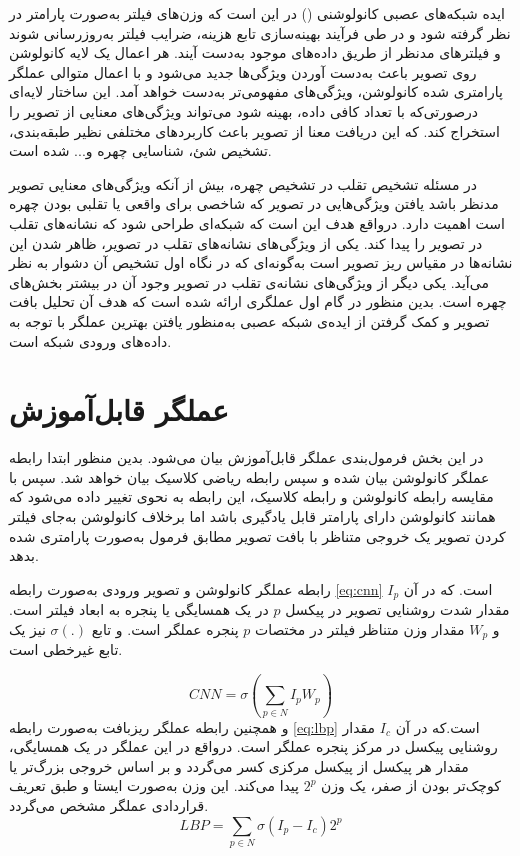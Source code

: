 ایده شبکه‌های عصبی کانولوشنی
 () 
در این است که وزن‌های فیلتر به‌صورت پارامتر در نظر گرفته شود و در طی فرآیند بهینه‌سازی تابع هزینه، ضرایب فیلتر به‌روزرسانی شوند و فیلترهای مد‌نظر از طریق داده‌های موجود به‌دست آیند. 
هر اعمال یک لایه کانولوشن روی تصویر باعث به‌دست آوردن ویژگی‌ها جدید می‌شود و با اعمال متوالی عملگر پارامتری شده کانولوشن، ویژگی‌های مفهومی‌تر به‌دست خواهد آمد. این ساختار لایه‌ای درصورتی‌که با تعداد کافی داده، بهینه شود می‌تواند ویژگی‌های معنایی از تصویر را استخراج کند. که این دریافت معنا از تصویر باعث کاربردهای مختلفی نظیر طبقه‌بندی، تشخیص شئ، شناسایی چهره و... شده است.

در مسئله تشخیص تقلب در تشخیص چهره، بیش از آنکه ویژگی‌های معنایی تصویر مد‌نظر باشد یافتن ویژگی‌هایی در تصویر که شاخصی برای واقعی یا تقلبی بودن چهره است اهمیت دارد. در‌واقع هدف این است که شبکه‌ای طراحی شود که نشانه‌های تقلب در تصویر را پیدا کند. یکی از ویژگی‌های نشانه‌های تقلب در تصویر، ظاهر شدن این نشانه‌ها در مقیاس ریز تصویر است به‌گونه‌ای که در نگاه اول تشخیص آن دشوار به نظر می‌آید. یکی دیگر از ویژگی‌های نشانه‌ی تقلب در تصویر وجود آن در بیشتر بخش‌های چهره است. بدین منظور در گام اول عملگری ارائه شده است که هدف آن تحلیل بافت تصویر و کمک گرفتن از ایده‌ی شبکه عصبی به‌منظور یافتن بهترین عملگر با توجه به داده‌های ورودی شبکه است.

\section{عملگر  قابل‌آموزش}
در این بخش فرمول‌بندی عملگر 
قابل‌آموزش بیان می‌شود. بدین منظور ابتدا رابطه عملگر کانولوشن بیان شده و سپس رابطه ریاضی 
کلاسیک بیان خواهد شد. سپس با مقایسه رابطه کانولوشن و رابطه 
کلاسیک، این رابطه به نحوی تغییر داده می‌شود که همانند کانولوشن دارای پارامتر  قابل یادگیری باشد اما بر‌خلاف کانولوشن به‌جای فیلتر کردن تصویر یک خروجی متناظر با بافت تصویر مطابق فرمول 
به‌صورت پارامتری شده بدهد.

رابطه عملگر کانولوشن و تصویر ورودی به‌صورت رابطه 
\ref{eq:cnn}
است. که در آن 
$I_p$
مقدار شدت روشنایی تصویر در پیکسل $p$ در یک همسایگی یا پنجره به ابعاد فیلتر است. و 
 $W_p$
مقدار وزن متناظر فیلتر در مختصات $p$ پنجره عملگر است. و تابع
$\sigma(.)$  
نیز یک تابع غیرخطی است.

\begin{equation}\label{eq:cnn}
	CNN=\sigma(\sum_{p\in N}I_pW_p)
\end{equation}
و همچنین رابطه عملگر ریزبافت
 به‌صورت رابطه
\ref{eq:lbp}
 است.که در آن
$I_c$
   مقدار روشنایی پیکسل در مرکز پنجره عملگر است. در‌واقع در این عملگر در یک همسایگی، مقدار هر پیکسل از پیکسل مرکزی کسر می‌گردد و بر اساس خروجی بزرگ‌تر یا کوچک‌تر بودن از صفر، یک وزن  
$2^p$   
   پیدا می‌کند. این وزن به‌صورت ایستا و طبق تعریف قراردادی عملگر مشخص می‌گردد.
\begin{equation}\label{eq:lbp}
	LBP=\sum_{p\in N}\sigma(I_p-I_c)2^p 
\end{equation}

